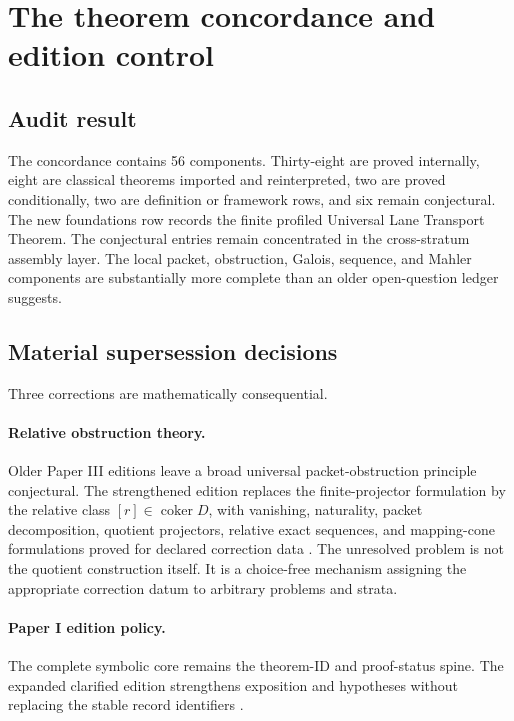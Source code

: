 \documentclass[11pt]{article}
\theoremstyle{definition}
\theoremstyle{remark}
\DeclareMathOperator{\coker}{coker}
\begin{document}
\section{The theorem concordance and edition control}

\subsection{Audit result}

The concordance contains 56 components. Thirty-eight are proved internally, eight are classical theorems imported and reinterpreted, two are proved conditionally, two are definition or framework rows, and six remain conjectural. The new foundations row records the finite profiled Universal Lane Transport Theorem. The conjectural entries remain concentrated in the cross-stratum assembly layer. The local packet, obstruction, Galois, sequence, and Mahler components are substantially more complete than an older open-question ledger suggests.




\subsection{Material supersession decisions}

Three corrections are mathematically consequential.

\paragraph{Relative obstruction theory.}
Older Paper III editions leave a broad universal packet-obstruction principle conjectural. The strengthened edition replaces the finite-projector formulation by the relative class \([r]\in\coker D\), with vanishing, naturality, packet decomposition, quotient projectors, relative exact sequences, and mapping-cone formulations proved for declared correction data \cite{P3,MIG}. The unresolved problem is not the quotient construction itself. It is a choice-free mechanism assigning the appropriate correction datum to arbitrary problems and strata.

\paragraph{Paper I edition policy.}
The complete symbolic core remains the theorem-ID and proof-status spine. The expanded clarified edition strengthens exposition and hypotheses without replacing the stable record identifiers \cite{P1}.
\end{document}
